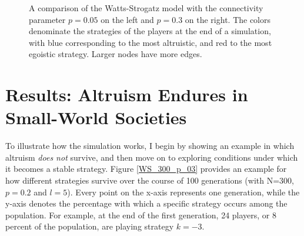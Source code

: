 \documentclass{JASSS}
\begin{document}
\begin{figure}%
	\centering
	\qquad
	\caption{A comparison of the Watts-Strogatz model with  the connectivity parameter $p=0.05$ on the left and $p=0.3$ on the right. The colors denominate the strategies of the players at the end of a simulation, with blue corresponding to the most altruistic, and red to the most egoistic strategy. Larger nodes have more edges.}%
	\label{WS_300_illustrate_p}%
\end{figure}

\section*{Results: Altruism Endures in Small-World Societies}
To illustrate how the simulation works, I begin by showing an example in which altruism \textit{does not} survive, and then move on to exploring conditions under which it becomes a stable strategy. Figure \ref{WS_300_p_03} provides an example for how different strategies survive over the course of 100 generations (with N=300, $p=0.2$ and $l=5$). Every point on the x-axis represents one generation, while the y-axis denotes the percentage with which a specific strategy occurs among the population. For example, at the end of the first generation, 24 players, or 8 percent of the population, are playing strategy $k=-3$.
\end{document}
